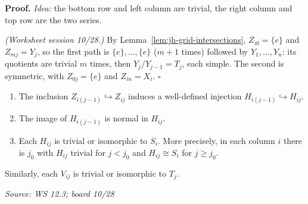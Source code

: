\documentclass[11pt]{report}
\renewenvironment{proof}[1][Proof]{\noindent\textbf{#1.} }{\hfill$\square$\par\vspace{5pt}}
\newcommand{\srcline}[1]{\par\hfill{\footnotesize\textit{Source: #1}}}
\begin{document}
\begin{proof}
\textit{Idea:} the bottom row and left column are trivial, the right column and top row are the two series.\par
\textit{(Worksheet session 10/28.)} By Lemma~\ref{lem:jh-grid-intersections}, $Z_{i0} = \{e\}$ and $Z_{mj} = Y_j$, so the first path is $\{e\}, \ldots, \{e\}$ ($m + 1$ times) followed by $Y_1, \ldots, Y_n$: its quotients are trivial $m$ times, then $Y_j/Y_{j-1} = T_j$, each simple. The second is symmetric, with $Z_{0j} = \{e\}$ and $Z_{in} = X_i$.
\end{proof}

\begin{propbox}\label{prop:jh-horizontal-edges}
\begin{enumerate}
    \item The inclusion $Z_{i(j-1)} \hookrightarrow Z_{ij}$ induces a well-defined injection $H_{i(j-1)} \hookrightarrow H_{ij}$.
    \item The image of $H_{i(j-1)}$ is normal in $H_{ij}$.
    \item Each $H_{ij}$ is trivial or isomorphic to $S_i$. More precisely, in each column $i$ there is $j_0$ with $H_{ij}$ trivial for $j < j_0$ and $H_{ij} \cong S_i$ for $j \geq j_0$.
\end{enumerate}
Similarly, each $V_{ij}$ is trivial or isomorphic to $T_j$.
\srcline{WS 12.3; board 10/28}
\end{propbox}
\end{document}
